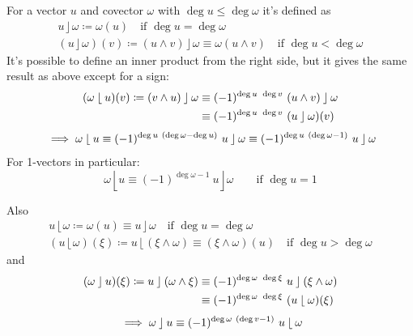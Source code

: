 \documentclass[\ifafour a4paper,12pt,\else a5paper,10pt,\fi%
onecolumn,oneside,article,%
british%
]{memoir}
\theoremstyle{remark}
\theoremstyle{innote}
\newcommand*{\defd}{\coloneqq}
\renewcommand*{\le}{\leqslant}%
\renewcommand*{\|}[1][]{\nonscript\,#1\vert\nonscript\;\mathopen{}}
\newcommand*{\ii}{\mathbin{\rfloor}}
\newcommand*{\rii}{\mathbin{\lfloor}}
\begin{document}
For a vector $u$ and covector $\omega$ with $\deg u \le \deg\omega$ it's
defined as
\begin{equation}
  \label{eq:inner_prod}
  \begin{gathered}
    u \ii \omega \defd \omega(u) \quad\text{if } \deg u=\deg\omega
\\
(u \ii \omega)(v) \defd (u\land v)\ii \omega \equiv \omega(u \land v)
 \quad\text{if } \deg u < \deg\omega
  \end{gathered}
\end{equation}
It's possible to define an inner product from the right side, but it gives
the same result as above except for a sign:
\begin{equation}
  \label{eq:right_inner_prod}
\begin{gathered}
  \begin{aligned}
  (\omega \rii u)(v) \defd (v\land u)\ii \omega
  &\equiv (-1)^{\deg u\ \deg v}\ (u\land v)\ii \omega
  \\&\equiv (-1)^{\deg u\ \deg v}\ (u \ii \omega)(v)
  \end{aligned}
  \\[\jot]
  {}\implies
\omega \rii u \equiv (-1)^{\deg u\ (\deg\omega-\deg u)}\ 
u \ii \omega \equiv (-1)^{\deg u\ (\deg\omega-1)}\ 
u \ii \omega
\end{gathered}
\end{equation}
For 1-vectors in particular:
\begin{equation}
  \label{eq:right_inner_equiv_1vector}
  \omega \rii u \equiv (-1)^{\deg\omega-1}\ 
  u \ii \omega
  \qquad\text{if }\deg u = 1
\end{equation}

Also
\begin{equation}
  \label{eq:ext_inner_prod}
  \begin{gathered}
    u \rii \omega \defd \omega(u) \equiv u \ii \omega \quad\text{if } \deg u=\deg\omega
\\
(u \rii \omega)(\xi) \defd u\rii(\xi\land \omega) \equiv (\xi\land\omega)(u)
\quad\text{if } \deg u > \deg\omega
\end{gathered}
\end{equation}
and
\begin{equation}
  \label{eq:ext_right_inner_prod}
\begin{gathered}
  \begin{aligned}
    (\omega\ii u)(\xi) \defd
    u\ii (\omega \land \xi)
  &\equiv (-1)^{\deg \omega\ \deg \xi}\ u\ii (\xi \land \omega)
  \\&\equiv (-1)^{\deg \omega\ \deg \xi}\ (u \rii \omega)(\xi)
  \end{aligned}
  \\[\jot]
  {}\implies
  \omega\ii u \equiv (-1)^{\deg \omega\ (\deg v-1)}\ 
u \rii \omega
\end{gathered}
\end{equation}
\end{document}
